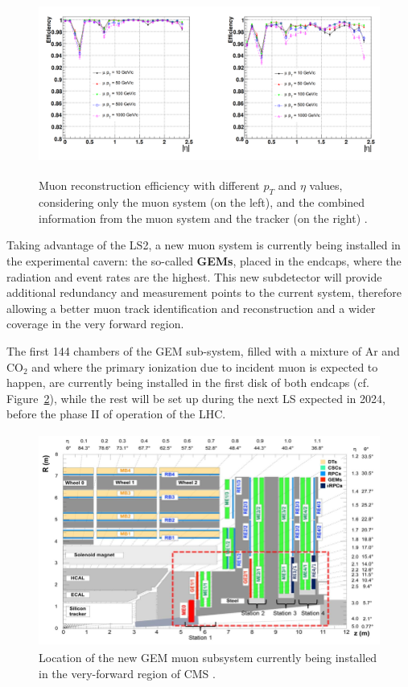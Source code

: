 \documentclass[a4paper, 10pt, openright]{report}
\begin{document}
\begin{figure}[htbp]
\begin{center}
\includegraphics[width=14cm, height=6cm]{figs/muonRecoEff.png}
\caption{Muon reconstruction efficiency with different $p_T$ and $\eta$ values, considering only the muon system (on the left), and the combined information from the muon system and the tracker (on the right) \cite{CMSDescription}.}
\label{fig:MuonRecoEff}
\end{center}
\end{figure}

Taking advantage of the \ac{LS}2, a new muon system is currently being installed in the experimental cavern: the so-called \textbf{\acfp{GEM}}, placed in the endcaps, where the radiation and event rates are the highest. This new subdetector will provide additional redundancy and measurement points to the current system, therefore allowing a better muon track identification and reconstruction and a wider coverage in the very forward region. 

The first 144 chambers of the \ac{GEM} sub-system, filled with a mixture of Ar and CO$_2$ and where the primary ionization due to incident muon is expected to happen, are currently being installed in the first disk of both endcaps (cf. Figure~\ref{fig:CMSGEM}), while the rest will be set up during the next \ac{LS} expected in 2024, before the phase II of operation of the \ac{LHC}.

\begin{figure}[htbp]
\begin{center}
\includegraphics[width=12cm, height=7cm]{figs/CMSGEM.png}
\caption{Location of the new \ac{GEM} muon subsystem currently being installed in the very-forward region of \ac{CMS} \cite{CMSDescription}.}
\label{fig:CMSGEM}
\end{center}
\end{figure}
\end{document}
